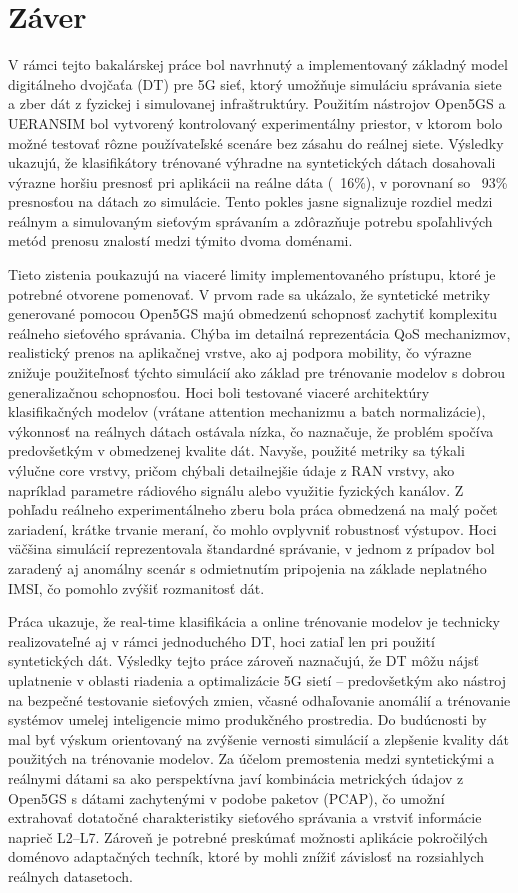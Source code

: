 \chapter{Záver}

V rámci tejto bakalárskej práce bol navrhnutý a implementovaný základný model digitálneho dvojčaťa (DT) pre 5G sieť, ktorý umožňuje simuláciu správania siete a zber dát z fyzickej i simulovanej infraštruktúry. Použitím nástrojov Open5GS a UERANSIM bol vytvorený kontrolovaný experimentálny priestor, v ktorom bolo možné testovať rôzne používateľské scenáre bez zásahu do reálnej siete. Výsledky ukazujú, že klasifikátory trénované výhradne na syntetických dátach dosahovali výrazne horšiu presnosť pri aplikácii na reálne dáta (~16\%), v porovnaní so ~93\% presnosťou na dátach zo simulácie. Tento pokles jasne signalizuje rozdiel medzi reálnym a simulovaným sieťovým správaním a zdôrazňuje potrebu spoľahlivých metód prenosu znalostí medzi týmito dvoma doménami.

Tieto zistenia poukazujú na viaceré limity implementovaného prístupu, ktoré je potrebné otvorene pomenovať. V prvom rade sa ukázalo, že syntetické metriky generované pomocou Open5GS majú obmedzenú schopnosť zachytiť komplexitu reálneho sieťového správania. Chýba im detailná reprezentácia QoS mechanizmov, realistický prenos na aplikačnej vrstve, ako aj podpora mobility, čo výrazne znižuje použiteľnosť týchto simulácií ako základ pre trénovanie modelov s dobrou generalizačnou schopnosťou. Hoci boli testované viaceré architektúry klasifikačných modelov (vrátane attention mechanizmu a batch normalizácie), výkonnosť na reálnych dátach ostávala nízka, čo naznačuje, že problém spočíva predovšetkým v obmedzenej kvalite dát. Navyše, použité metriky sa týkali výlučne core vrstvy, pričom chýbali detailnejšie údaje z RAN vrstvy, ako napríklad parametre rádiového signálu alebo využitie fyzických kanálov. Z pohľadu reálneho experimentálneho zberu bola práca obmedzená na malý počet zariadení, krátke trvanie meraní, čo mohlo ovplyvniť robustnosť výstupov. Hoci väčšina simulácií reprezentovala štandardné správanie, v jednom z prípadov bol zaradený aj anomálny scenár s odmietnutím pripojenia na základe neplatného IMSI, čo pomohlo zvýšiť rozmanitosť dát.

Práca ukazuje, že real-time klasifikácia a online trénovanie modelov je technicky realizovateľné aj v rámci jednoduchého DT, hoci zatiaľ len pri použití syntetických dát. Výsledky tejto práce zároveň naznačujú, že DT môžu nájsť uplatnenie v oblasti riadenia a optimalizácie 5G sietí – predovšetkým ako nástroj na bezpečné testovanie sieťových zmien, včasné odhaľovanie anomálií a trénovanie systémov umelej inteligencie mimo produkčného prostredia. Do budúcnosti by mal byť výskum orientovaný na zvýšenie vernosti simulácií a zlepšenie kvality dát použitých na trénovanie modelov. Za účelom premostenia medzi syntetickými a reálnymi dátami sa ako perspektívna javí kombinácia metrických údajov z Open5GS s dátami zachytenými v podobe paketov (PCAP), čo umožní extrahovať dotatočné charakteristiky sieťového správania a vrstviť informácie naprieč L2–L7. Zároveň je potrebné preskúmať možnosti aplikácie pokročilých doménovo adaptačných techník, ktoré by mohli znížiť závislosť na rozsiahlych reálnych datasetoch.

